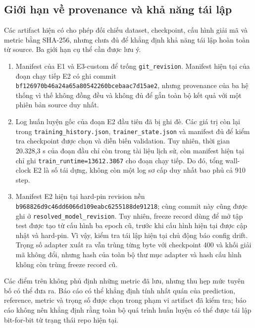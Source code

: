 
\subsection{Giới hạn về provenance và khả năng tái lập}

Các artifact hiện có cho phép đối chiếu dataset, checkpoint, cấu hình giải mã
và metric bằng SHA-256, nhưng chưa đủ để khẳng định khả năng tái lập hoàn toàn
từ source. Ba giới hạn cụ thể cần được lưu ý.

\begin{enumerate}
  \item Manifest của E1 và E3-custom để trống \texttt{git\_revision}. Manifest
  hiện tại của đoạn chạy tiếp E2 có ghi commit
  \texttt{bf126970b46a24a65a80542260bcebaac7d15ae2}, nhưng provenance của ba hệ
  thống vì thế không đồng đều và không đủ để gắn toàn bộ kết quả với một phiên
  bản source duy nhất.

  \item Log huấn luyện gốc của đoạn E2 đầu tiên đã bị ghi đè. Các giá trị còn
  lại trong \texttt{training\_\allowbreak history.json},
  \texttt{trainer\_\allowbreak state.json} và manifest đủ để kiểm tra checkpoint
  được chọn và diễn biến validation. Tuy nhiên, thời gian 20.328,3 s của đoạn
  đầu chỉ còn trong tài liệu lịch sử, còn manifest hiện tại chỉ ghi
  \texttt{train\_\allowbreak runtime=13612.3867} cho đoạn chạy
  tiếp. Do đó, tổng wall-clock E2 là số tái dựng, không còn một log sơ cấp duy
  nhất bao phủ cả 910 step.

  \item Manifest E2 hiện tại hard-pin revision nền
  \texttt{b968826d9c46dd6066d109eabc6255188de91218}; cùng commit này cũng được
  ghi ở \texttt{resolved\_model\_revision}. Tuy nhiên, freeze record dùng để mở
  tập test được tạo từ cấu hình ba epoch cũ, trước khi cấu hình hiện tại được
  cập nhật và hard-pin. Vì vậy, kiểm tra tái lập hiện tại chủ động báo config
  drift. Trọng số adapter xuất ra vẫn trùng từng byte với checkpoint 400 và
  khối giải mã không đổi, nhưng hash của toàn bộ thư mục adapter và hash cấu
  hình không còn trùng freeze record cũ.
\end{enumerate}

Các điểm trên không phủ định những metric đã lưu, nhưng thu hẹp mức tuyên bố có
thể đưa ra. Báo cáo có thể khẳng định tính nhất quán của prediction, reference,
metric và trọng số được chọn trong phạm vi artifact đã kiểm tra; báo cáo không
nên khẳng định rằng toàn bộ quá trình huấn luyện có thể được tái lập bit-for-bit
từ trạng thái repo hiện tại.
